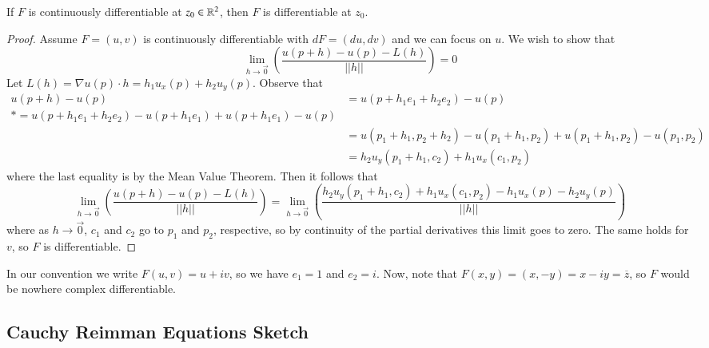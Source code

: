 \documentclass[12pt, a4paper, oneside, openright, titlepage]{book}
\begin{document}
\begin{defn}
    If $F$ is continuously differentiable at $z_0 \in \mathbb R^2$, then $F$ is differentiable at $z_0$. 
\end{defn}
\begin{proof}
    Assume $F= (u,v)$ is continuously differentiable with $dF = (du,dv)$ and we can focus on $u$. We wish to show that \begin{equation*}
        \lim\limits_{h\rightarrow \vec{0}}\left(\frac{u(p+h)-u(p)-L(h)}{||h||}\right) = 0
    \end{equation*}
    Let $L(h) = \nabla u(p)\cdot h = h_1u_x(p)+h_2u_y(p)$. Observe that \begin{align*}
        u(p+h)-u(p) &= u(p+h_1e_1+h_2e_2)-u(p) \\
        *= u(p+h_1e_1+h_2e_2) - u(p+h_1e_1)+u(p+h_1e_1)-u(p) \\
        &= u(p_1+h_1,p_2+h_2) - u(p_1+h_1,p_2) + u(p_1+h_1,p_2) - u(p_1,p_2) \\
        &= h_2u_y(p_1+h_1,c_2) + h_1u_x(c_1,p_2)
    \end{align*}
    where the last equality is by the Mean Value Theorem. Then it follows that \begin{equation*}
        \lim\limits_{h\rightarrow \vec{0}}\left(\frac{u(p+h)-u(p)-L(h)}{||h||}\right) = \lim\limits_{h\rightarrow \vec{0}}\left(\frac{h_2u_y(p_1+h_1,c_2) + h_1u_x(c_1,p_2)-h_1u_x(p) - h_2u_y(p)}{||h||}\right) 
    \end{equation*}
    where as $h\rightarrow \vec{0}$, $c_1$ and $c_2$ go to $p_1$ and $p_2$, respective, so by continuity of the partial derivatives this limit goes to zero. The same holds for $v$, so $F$ is differentiable.
\end{proof}


In our convention we write $F(u,v) = u+iv$, so we have $e_1 = 1$ and $e_2 = i$. Now, note that $F(x,y) = (x,-y) = x-iy = \overline{z}$, so $F$ would be nowhere complex differentiable.


        

\subsection{Cauchy Reimman Equations Sketch}
\end{document}
